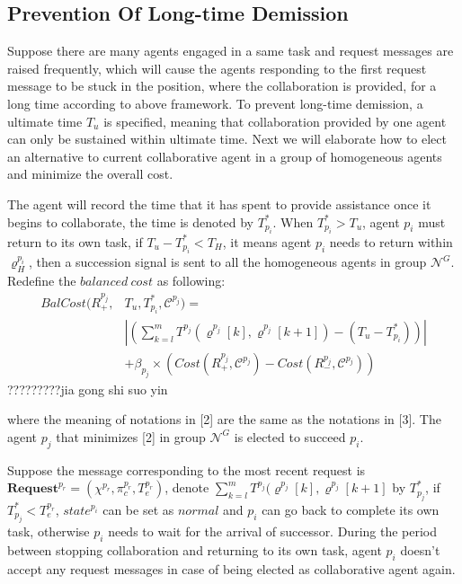 \documentclass[journal]{IEEEtran}
\begin{document}
\subsection{Prevention Of Long-time Demission}
Suppose there are many agents engaged in a same task and request messages are raised frequently, which will cause the agents responding to the first request message to be stuck in the position, where the collaboration is provided, for a long time according to above framework. To prevent long-time demission, a ultimate time $T_u$ is specified, meaning that collaboration provided by one agent can only be sustained within ultimate time. Next we will elaborate how to elect an alternative to current collaborative agent in a group of homogeneous agents and minimize the overall cost.\par
The agent will record the time that it has spent to provide assistance once it begins to collaborate, the time is denoted by $T_{p_i}^{\ast}$. When $T_{p_i}^{\ast}>T_u$, agent $p_i$ must return to its own task, if $T_u-T_{p_i}^{\ast}<T_H$, it means agent $p_i$ needs to return within $\varrho^{p_i}_H$, then a succession signal is sent to all the homogeneous agents in group $\mathcal{N}^G$. Redefine the $balanced\ cost$ as following:
\[ \begin{split}
BalCost(R^{p_j}_+,&T_u,T_{p_i}^{\ast},\mathcal{C}^{p_j})=\\
&|(\sum_{k=l}^{m}T^{p_j}(\varrho^{p_j}[k],\varrho^{p_j}[k+1])-(T_u-T_{p_i}^{\ast}))|\\
&+\beta_{p_j} \times (Cost(R^{p_j}_+,\mathcal{C}^{p_j})-Cost(R^{p_j}_-,\mathcal{C}^{p_j}))
\end{split} \]
?????????jia gong shi suo yin

where the meaning of notations in [2] are the same as the notations in [3]. The agent $p_j$ that minimizes [2] in group $\mathcal{N}^G$ is elected to succeed $p_i$.\par
Suppose the message corresponding to the most recent request is $\textbf{Request}^{p_r}=(\chi^{p_r},\pi_c^{p_r},T^{p_r}_e)$, denote $\sum_{k=l}^{m}T^{p_j}(\varrho^{p_j}[k],\varrho^{p_j}[k+1]$ by $T_{p_j}^{\ast}$, if $T_{p_j}^{\ast}<T^{p_r}_e$, $state^{p_i}$ can be set as $normal$ and $p_i$ can go back to complete its own task, otherwise $p_i$ needs to wait for the arrival of successor. During the period between stopping collaboration and returning to its own task, agent $p_i$ doesn't accept any request messages in case of being elected as collaborative agent again.
\end{document}
